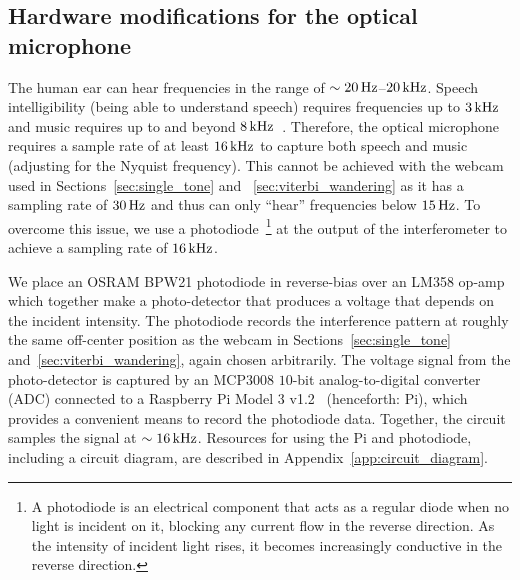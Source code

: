 \documentclass[paper-main.tex]{subfiles}
\begin{document}
\subsection{Hardware modifications for the optical microphone}
\label{sec:photodiode}
The human ear can hear frequencies in the range of $\sim 20\,{\rm Hz}$--$20\,{\rm kHz}$. 
Speech intelligibility (being able to understand speech) requires frequencies up to $3\,{\rm kHz}$ and music requires up to and beyond $8\,{\rm kHz}$~\cite{speech_intelligibility}. Therefore, the optical microphone requires a sample rate of at least $16\,{\rm kHz}$ to capture both speech and music (adjusting for the Nyquist frequency). 
This cannot be achieved with the webcam used in Sections~\ref{sec:single_tone} and ~\ref{sec:viterbi_wandering} as it has a sampling rate of $30\,{\rm Hz}$ and thus can only ``hear'' frequencies below $15\,{\rm Hz}$.
To overcome this issue, we use a photodiode~\footnote{A photodiode is an electrical component that acts as a regular diode when no light is incident on it, blocking any current flow in the reverse direction. As the intensity of incident light rises, it becomes increasingly conductive in the reverse direction.} at the output of the interferometer to achieve a sampling rate of $16\,{\rm kHz}$.

We place an OSRAM BPW21 photodiode in reverse-bias over an LM358 op-amp which together make a photo-detector that produces a voltage that depends on the incident intensity. 
The photodiode records the interference pattern at roughly the same off-center position as the webcam in Sections~\ref{sec:single_tone} and~\ref{sec:viterbi_wandering}, again chosen arbitrarily.
The voltage signal from the photo-detector is captured by an MCP3008 $10$-bit analog-to-digital converter (ADC) connected to a Raspberry Pi Model 3 v1.2~\cite{RaspberryPi:online} (henceforth: Pi), which provides a convenient means to record the photodiode data.
Together, the circuit samples the signal at $\sim 16\,{\rm kHz}$. 
Resources for using the Pi and photodiode, including a circuit diagram, are described in Appendix~\ref{app:circuit_diagram}.
\end{document}
